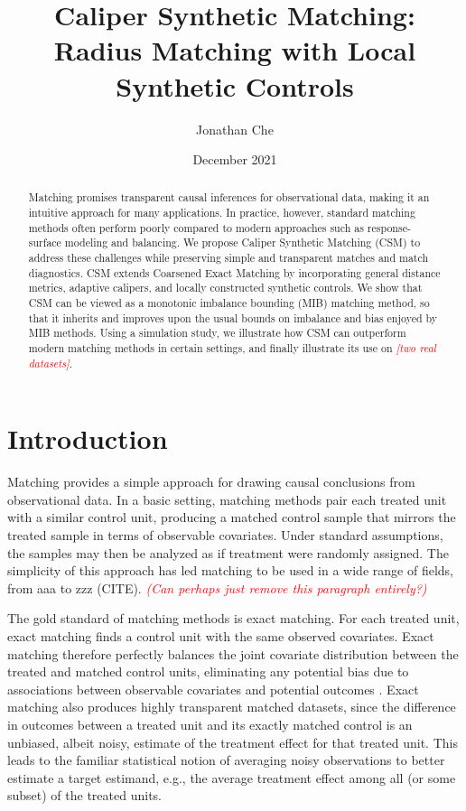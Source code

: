 \documentclass{article}
\title{Caliper Synthetic Matching: Radius Matching with Local Synthetic Controls}
\author{Jonathan Che}
\date{December 2021}
\newcommand{\note}[1]{\textcolor{red}{\textit{#1}}}
\begin{document}
\maketitle

\begin{abstract}
    Matching promises transparent causal inferences for observational data, making it an intuitive approach for many applications.
    In practice, however, standard matching methods often perform poorly compared to modern approaches such as response-surface modeling and balancing.
    We propose Caliper Synthetic Matching (CSM) to address these challenges while preserving simple and transparent matches and match diagnostics.
    CSM extends Coarsened Exact Matching \citep[CEM; ][]{iacus2012causal} by incorporating general distance metrics, adaptive calipers, and locally constructed synthetic controls.
    We show that CSM can be viewed as a monotonic imbalance bounding (MIB) matching method, so that it inherits and improves upon the usual bounds on imbalance and bias enjoyed by MIB methods.
    Using a simulation study, we illustrate how CSM can outperform modern matching methods in certain settings, and finally illustrate its use on \note{[two real datasets]}.
\end{abstract}

\section{Introduction}

Matching provides a simple approach for drawing causal conclusions from observational data.
In a basic setting, matching methods pair each treated unit with a similar control unit, producing a matched control sample that mirrors the treated sample in terms of observable covariates.
Under standard assumptions, the samples may then be analyzed as if treatment were randomly assigned.
The simplicity of this approach has led matching to be used in a wide range of fields, from aaa to zzz (CITE).
\note{(Can perhaps just remove this paragraph entirely?)}

The gold standard of matching methods is exact matching.
For each treated unit, exact matching finds a control unit with the same observed covariates.
Exact matching therefore perfectly balances the joint covariate distribution between the treated and matched control units,
eliminating any potential bias due to associations between observable covariates and potential outcomes \citep{imai2008misunderstandings}.
Exact matching also produces highly transparent matched datasets,
since the difference in outcomes between a treated unit and its exactly matched control is an unbiased, albeit noisy, estimate of the treatment effect for that treated unit.
This leads to the familiar statistical notion of averaging noisy observations to better estimate a target estimand, e.g., the average treatment effect among all (or some subset) of the treated units.
\end{document}
